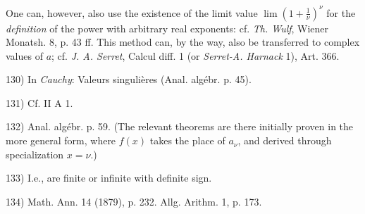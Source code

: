 \vfill
\leftline{\rule{2in}{0.4pt}}
\vspace{0.2cm}
{
\footnotesize
One can, however, also use the existence of the limit value $\lim (1 + \frac{1}{\nu})^\nu$ for the \textit{definition} of the power with arbitrary real exponents: cf. \textit{Th. Wulf}, Wiener Monatsh. 8, p. 43 ff. This method can, by the way, also be transferred to complex values of $a$; cf. \textit{J. A. Serret}, Calcul diff. 1 (or \textit{Serret-A. Harnack} 1), Art. 366.

130) In \textit{Cauchy}: Valeurs singulières (Anal. algébr. p. 45).

131) Cf. II A 1.

132) Anal. algébr. p. 59. (The relevant theorems are there initially proven in the more general form, where $f(x)$ takes the place of $a_\nu$, and derived through specialization $x = \nu$.)

133) I.e., are finite or infinite with definite sign.

134) Math. Ann. 14 (1879), p. 232. Allg. Arithm. 1, p. 173.

}